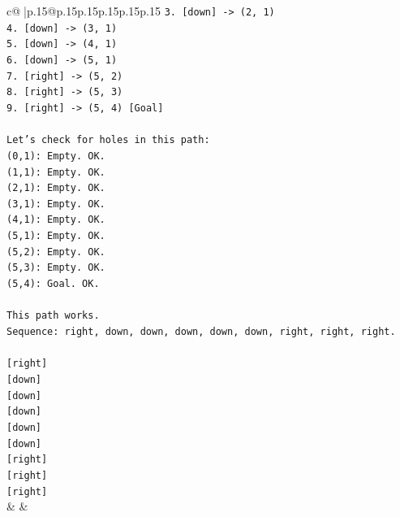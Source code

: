 \documentclass{article}
\begin{document}
{\begin{supertabular}{c@{$\;$}|p{.15\linewidth}@{}p{.15\linewidth}p{.15\linewidth}p{.15\linewidth}p{.15\linewidth}p{.15\linewidth}}
{{{\texttt{3. {[}down{]} {-}> (2, 1)} \\
\texttt{4. {[}down{]} {-}> (3, 1)} \\
\texttt{5. {[}down{]} {-}> (4, 1)} \\
\texttt{6. {[}down{]} {-}> (5, 1)} \\
\texttt{7. {[}right{]} {-}> (5, 2)} \\
\texttt{8. {[}right{]} {-}> (5, 3)} \\
\texttt{9. {[}right{]} {-}> (5, 4) {[}Goal{]}} \\
\\ 
\texttt{Let's check for holes in this path:} \\
\texttt{(0,1): Empty. OK.} \\
\texttt{(1,1): Empty. OK.} \\
\texttt{(2,1): Empty. OK.} \\
\texttt{(3,1): Empty. OK.} \\
\texttt{(4,1): Empty. OK.} \\
\texttt{(5,1): Empty. OK.} \\
\texttt{(5,2): Empty. OK.} \\
\texttt{(5,3): Empty. OK.} \\
\texttt{(5,4): Goal. OK.} \\
\\ 
\texttt{This path works.} \\
\texttt{Sequence: right, down, down, down, down, down, right, right, right.} \\
\\ 
\texttt{{[}right{]}} \\
\texttt{{[}down{]}} \\
\texttt{{[}down{]}} \\
\texttt{{[}down{]}} \\
\texttt{{[}down{]}} \\
\texttt{{[}down{]}} \\
\texttt{{[}right{]}} \\
\texttt{{[}right{]}} \\
\texttt{{[}right{]}} \\
            }
        }
    }
    & & \\ \\


\end{supertabular}}
\end{document}
